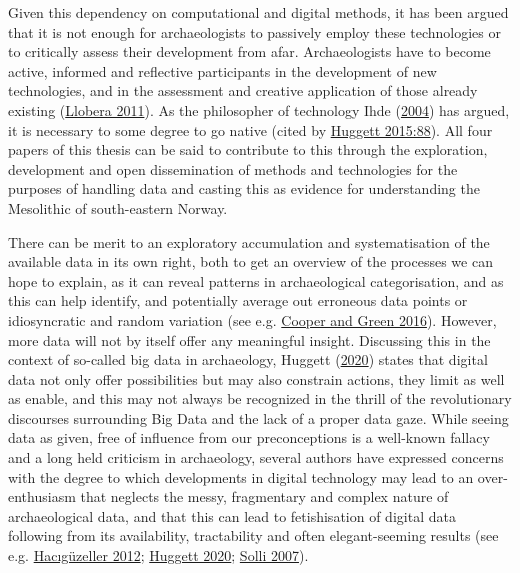 \documentclass[
  12pt,
  a4paper,
  oneside]{book}
\begin{document}
Given this dependency on computational and digital methods, it has been argued that it is not enough for archaeologists to passively employ these technologies or to critically assess their development from afar. Archaeologists have to become active, informed and reflective participants in the development of new technologies, and in the assessment and creative application of those already existing (\protect\hyperlink{ref-llobera2011}{Llobera 2011}). As the philosopher of technology Ihde (\protect\hyperlink{ref-ihde2004}{2004}) has argued, it is necessary to some degree to \textquotesingle go native\textquotesingle{} (cited by \protect\hyperlink{ref-huggett2015}{Huggett 2015:88}). All four papers of this thesis can be said to contribute to this through the exploration, development and open dissemination of methods and technologies for the purposes of handling data and casting this as evidence for understanding the Mesolithic of south-eastern Norway.

There can be merit to an exploratory accumulation and systematisation of the available data in its own right, both to get an overview of the processes we can hope to explain, as it can reveal patterns in archaeological categorisation, and as this can help identify, and potentially average out erroneous data points or idiosyncratic and random variation (see e.g. \protect\hyperlink{ref-cooper2016}{Cooper and Green 2016}). However, more data will not by itself offer any meaningful insight. Discussing this in the context of so-called \textquotesingle big data\textquotesingle{} in archaeology, Huggett (\protect\hyperlink{ref-huggett2020}{2020}) states that \textquotesingle digital data not only offer possibilities but may also constrain actions, they limit as well as enable, and this may not always be recognized in the thrill of the revolutionary discourses surrounding Big Data and the lack of a proper data gaze.\textquotesingle{} While seeing data as given, free of influence from our preconceptions is a well-known fallacy and a long held criticism in archaeology, several authors have expressed concerns with the degree to which developments in digital technology may lead to an over-enthusiasm that neglects the messy, fragmentary and complex nature of archaeological data, and that this can lead to fetishisation of digital data following from its availability, tractability and often elegant-seeming results (see e.g. \protect\hyperlink{ref-haciguzeller2012}{Hacıgüzeller 2012}; \protect\hyperlink{ref-huggett2020}{Huggett 2020}; \protect\hyperlink{ref-solli2007}{Solli 2007}).
\end{document}
